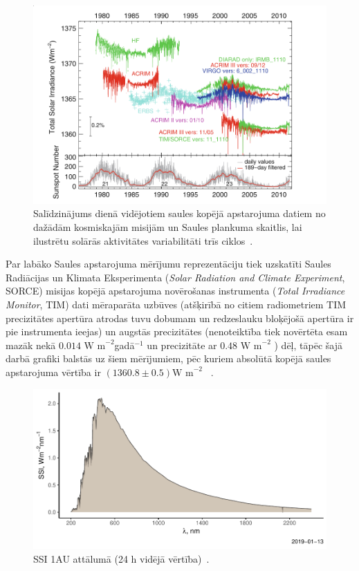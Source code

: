 \begin{figure}[h]
    \centering
    \includegraphics[width=\linewidth]{figures/misc/TSI_misijas.png}
    \caption{Salīdzinājums dienā vidējotiem saules kopējā apstarojuma datiem no dažādām kosmiskajām misijām un Saules plankuma skaitlis, lai ilustrētu solārās aktivitātes variabilitāti trīs ciklos~\cite{Frohlich2012}.}
    \label{fig:TSI_misijas}
\end{figure}

Par labāko Saules apstarojuma mērījumu reprezentāciju tiek uzskatīti Saules Radiācijas un Klimata Eksperimenta (\textit{Solar Radiation and Climate Experiment}, SORCE) misijas kopējā apstarojuma novērošanas instrumenta (\textit{Total Irradiance Monitor}, TIM)  dati mēraparāta uzbūves (atšķirībā no citiem radiometriem TIM precizitātes apertūra atrodas tuvu dobumam un redzeslauku bloķējošā apertūra ir pie instrumenta ieejas) un augstās precizitātes (nenoteiktība tiek novērtēta esam mazāk nekā $0.014$ $\textrm{W  m}^{-2}$gadā$^{-1}$ un precizitāte ar $0.48$ $\textrm{W  m}^{-2}$ \cite{TSIdata}) dēļ, tāpēc šajā darbā grafiki balstās uz šiem mērījumiem, pēc kuriem absolūtā kopējā saules apstarojuma vērtība ir $(1360.8 \pm 0.5) \textrm{W m}^{-2}$ ~\cite{Frohlich2012}.

\begin{figure}[h]
    \centering
    \includegraphics[width=\linewidth]{figures/misc/SSI.pdf}
    \caption{SSI 1AU attālumā (24 h vidējā vērtība)~\cite{SSIdata}.}
    \label{fig:SSI}
\end{figure}

